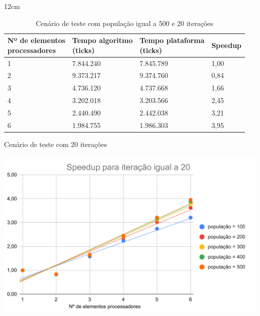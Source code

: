 \begin{table}[h]{12cm}
    \caption{Cenário de teste com população igual a 500 e 20 iterações}
    \label{tbl:taylor-vortex-parameters}
    \begin{tabular}{llll}
        \hline
        \shortstack[l]{Nº de elementos \\ processadores} & \shortstack[l]{Tempo algoritmo \\ (ticks)} & \shortstack[l]{Tempo plataforma \\ (ticks)} & Speedup \\
        \hline
        1 & 7.844.240 & 7.845.789 & 1,00 \\
        2 & 9.373.217 & 9.374.760 & 0,84 \\
        3 & 4.736.120 & 4.737.668 &	1,66 \\
        4 & 3.202.018 & 3.203.566 & 2,45 \\
        5 & 2.440.490 & 2.442.038 & 3,21 \\
        6 & 1.984.755 & 1.986.303 & 3,95 \\
        \hline
    \end{tabular}
\end{table}

\begin{graph}[h]{16cm}
    \caption{Cenário de teste com 20 iterações}
        \includegraphics[width=14cm]{graficos/Speedup para iteração igual a 20.pdf}
\end{graph}

